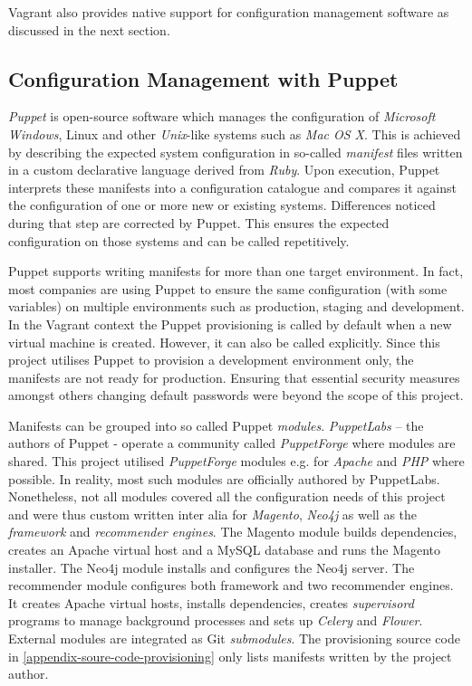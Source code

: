 Vagrant also provides native support for configuration management software as discussed in the next section.

\subsection{Configuration Management with Puppet}

\emph{Puppet} is open-source software which manages the configuration of \emph{Microsoft Windows}, Linux and other \emph{Unix}-like systems such as \emph{Mac OS X}. This is achieved by describing the expected system configuration in so-called \emph{manifest} files written in a custom declarative language derived from \emph{Ruby}. Upon execution, Puppet interprets these manifests into a configuration catalogue and compares it against the configuration of one or more new or existing systems. Differences noticed during that step are corrected by Puppet. This ensures the expected configuration on those systems and can be called repetitively.

Puppet supports writing manifests for more than one target environment. In fact, most companies are using Puppet to ensure the same configuration (with some variables) on multiple environments such as production, staging and development. In the Vagrant context the Puppet provisioning is called by default when a new virtual machine is created. However, it can also be called explicitly. Since this project utilises Puppet to provision a development environment only, the manifests are not ready for production. Ensuring that essential security measures amongst others changing default passwords were beyond the scope of this project.

Manifests can be grouped into so called Puppet \emph{modules}. \emph{PuppetLabs} -- the authors of Puppet - operate a community called \emph{PuppetForge} where modules are shared. This project utilised \emph{PuppetForge} modules e.g. for \emph{Apache} and \emph{PHP} where possible. In reality, most such modules are officially authored by PuppetLabs. Nonetheless, not all modules covered all the configuration needs of this project and were thus custom written inter alia for \emph{Magento}, \emph{Neo4j} as well as the \emph{framework} and \emph{recommender engines}. The Magento module builds dependencies, creates an Apache virtual host and a MySQL database and runs the Magento installer. The Neo4j module installs and configures the Neo4j server. The recommender module configures both framework and two recommender engines. It creates Apache virtual hosts, installs dependencies, creates \emph{supervisord} programs to manage background processes and sets up \emph{Celery} and \emph{Flower}. External modules are integrated as Git \emph{submodules}. The provisioning source code in \ref{appendix-soure-code-provisioning} only lists manifests written by the project author.

